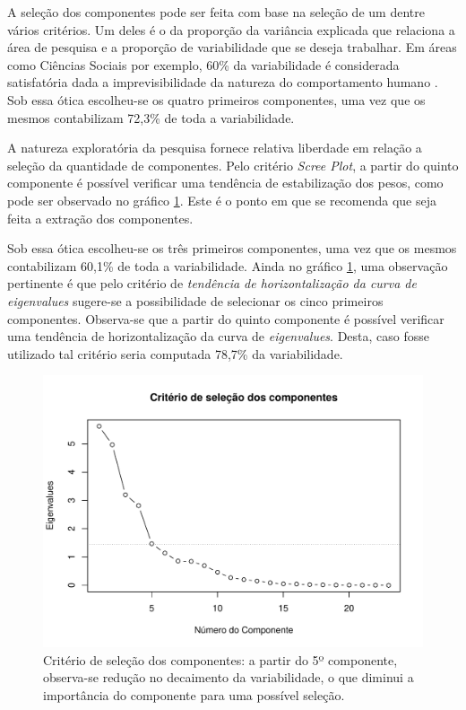 A seleção dos componentes pode ser feita com base na seleção de um dentre vários critérios. Um deles é o da proporção da variância explicada que relaciona a área de pesquisa e a proporção de variabilidade que se deseja trabalhar. Em áreas como Ciências Sociais por exemplo, 60\% da variabilidade é considerada satisfatória dada a imprevisibilidade da natureza do comportamento humano \cite[p.~103]{larose2015data}. Sob essa ótica escolheu-se os quatro primeiros componentes, uma vez que os mesmos contabilizam 72,3\% de toda a variabilidade. 

A natureza exploratória da pesquisa fornece relativa liberdade em relação a seleção da quantidade de componentes. Pelo critério \textit{Scree Plot}, a partir do quinto componente é possível verificar uma tendência de estabilização dos pesos, como pode ser observado no gráfico \ref{fig: scree-plot-pca}. Este é o ponto em que se recomenda que seja feita a extração dos componentes.

Sob essa ótica escolheu-se os três primeiros componentes, uma vez que os mesmos contabilizam 60,1\% de toda a variabilidade. Ainda no gráfico \ref{fig: scree-plot-pca}, uma observação pertinente é que pelo critério de \textit{tendência de horizontalização da curva de eigenvalues} sugere-se a possibilidade de selecionar os cinco primeiros componentes. Observa-se que a partir do quinto componente é possível verificar uma tendência de horizontalização da curva de \textit{eigenvalues}. Desta, caso fosse utilizado tal critério seria computada 78,7\% da variabilidade.

\begin{figure}[H]
		\centering
		\includegraphics[scale=.80]{../../graficos/latex-graph-scree-plot-pca.pdf}
		\caption{Critério de seleção dos componentes: a partir do 5º componente, observa-se redução no decaimento da variabilidade, o que diminui a importância do componente para uma possível seleção.}
		\label{fig: scree-plot-pca}
\end{figure}

